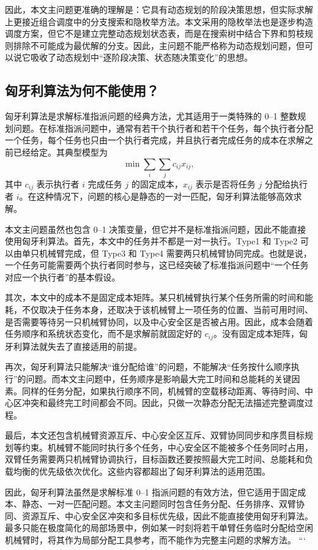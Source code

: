 因此，本文主问题更准确的理解是：它具有动态规划的阶段决策思想，但实际求解上更接近组合调度中的分支搜索和隐枚举方法。本文采用的隐枚举法也是逐步构造调度方案，但它不是建立完整动态规划状态表，而是在搜索树中结合下界和剪枝规则排除不可能成为最优解的分支。因此，主问题不能严格称为动态规划问题，但可以说它吸收了动态规划中“逐阶段决策、状态随决策变化”的思想。

\subsection{匈牙利算法为何不能使用？}

匈牙利算法是求解标准指派问题的经典方法，尤其适用于一类特殊的 0--1 整数规划问题。在标准指派问题中，通常有若干个执行者和若干个任务，每个执行者分配一个任务，每个任务也只由一个执行者完成，并且执行者完成任务的成本在求解之前已经给定。其典型模型为
\[
\min \sum_i\sum_j c_{ij}x_{ij},
\]
其中 $c_{ij}$ 表示执行者 $i$ 完成任务 $j$ 的固定成本，$x_{ij}$ 表示是否将任务 $j$ 分配给执行者 $i$。在这种情况下，问题的核心是静态的一对一匹配，匈牙利算法能够高效求解。

本文主问题虽然也包含 0--1 决策变量，但它并不是标准指派问题，因此不能直接使用匈牙利算法。首先，本文中的任务并不都是一对一执行。Type1 和 Type2 可以由单只机械臂完成，但 Type3 和 Type4 需要两只机械臂协同完成。也就是说，一个任务可能需要两个执行者同时参与，这已经突破了标准指派问题中“一个任务对应一个执行者”的基本假设。

其次，本文中的成本不是固定成本矩阵。某只机械臂执行某个任务所需的时间和能耗，不仅取决于任务本身，还取决于该机械臂上一项任务的位置、当前可用时间、是否需要等待另一只机械臂协同，以及中心安全区是否被占用。因此，成本会随着任务顺序和系统状态变化，而不是求解前就固定好的 $c_{ij}$。没有固定成本矩阵，匈牙利算法就失去了直接适用的前提。

再次，匈牙利算法只能解决“谁分配给谁”的问题，不能解决“任务按什么顺序执行”的问题。而本文主问题中，任务顺序是影响最大完工时间和总能耗的关键因素。同样的任务分配，如果执行顺序不同，机械臂的空载移动距离、等待时间、中心区冲突和最终完工时间都会不同。因此，只做一次静态分配无法描述完整调度过程。

最后，本文还包含机械臂资源互斥、中心安全区互斥、双臂协同同步和序贯目标规划等约束。机械臂不能同时执行多个任务，中心安全区不能被多个任务同时占用，双臂任务需要两只机械臂协调执行，目标函数还要按照最大完工时间、总能耗和负载均衡的优先级依次优化。这些内容都超出了匈牙利算法的适用范围。

因此，匈牙利算法虽然是求解标准 0--1 指派问题的有效方法，但它适用于固定成本、静态、一对一匹配问题。本文主问题同时包含任务分配、任务排序、双臂协同、资源互斥、中心安全区冲突和多目标优先级，因此不能直接使用匈牙利算法。最多只能在极度简化的局部场景中，例如某一时刻将若干单臂任务临时分配给空闲机械臂时，将其作为局部分配工具参考，而不能作为完整主问题的求解方法。
```
